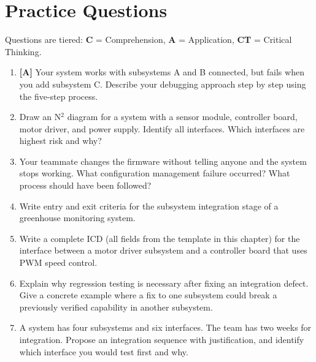 \documentclass[11pt,letterpaper,twoside,openany]{book}
\begin{document}
\section{Practice Questions}
Questions are tiered: \textbf{C} = Comprehension, \textbf{A} = Application, \textbf{CT} = Critical Thinking.
\begin{enumerate}[leftmargin=1.5em]
\item \textbf{[A]} Your system works with subsystems A and B connected, but fails when you add subsystem C. Describe your debugging approach step by step using the five-step process.
\item Draw an N$^2$ diagram for a system with a sensor module, controller board, motor driver, and power supply. Identify all interfaces. Which interfaces are highest risk and why?
\item Your teammate changes the firmware without telling anyone and the system stops working. What configuration management failure occurred? What process should have been followed?
\item Write entry and exit criteria for the subsystem integration stage of a greenhouse monitoring system.
\item Write a complete ICD (all fields from the template in this chapter) for the interface between a motor driver subsystem and a controller board that uses PWM speed control.
\item Explain why regression testing is necessary after fixing an integration defect. Give a concrete example where a fix to one subsystem could break a previously verified capability in another subsystem.
\item A system has four subsystems and six interfaces. The team has two weeks for integration. Propose an integration sequence with justification, and identify which interface you would test first and why.
\end{enumerate}
\end{document}
